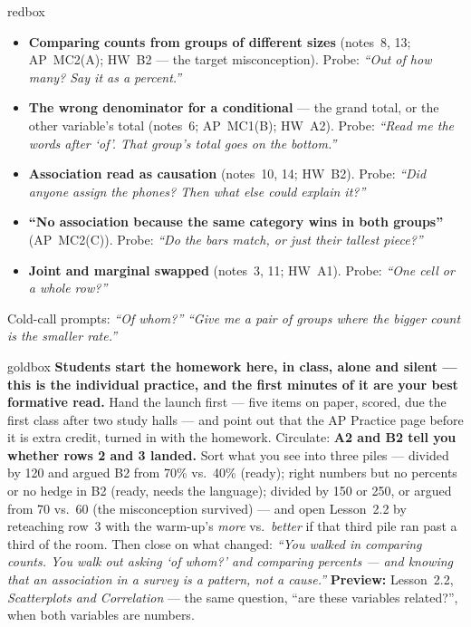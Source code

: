 \documentclass[10pt]{article}
\begin{document}
\boxguard
\begin{skillbox}{redbox}
\begin{itemize}[leftmargin=1.2em, nosep]
  \item \textbf{Comparing counts from groups of different sizes} (notes~8, 13; AP~MC2(A);
        HW~B2 --- the target misconception). Probe: \emph{``Out of how many? Say it as a
        percent.''}
  \item \textbf{The wrong denominator for a conditional} --- the grand total, or the other
        variable's total (notes~6; AP~MC1(B); HW~A2). Probe: \emph{``Read me the words after
        `of'. That group's total goes on the bottom.''}
  \item \textbf{Association read as causation} (notes~10, 14; HW~B2). Probe: \emph{``Did anyone
        assign the phones? Then what else could explain it?''}
  \item \textbf{``No association because the same category wins in both groups''} (AP~MC2(C)).
        Probe: \emph{``Do the bars match, or just their tallest piece?''}
  \item \textbf{Joint and marginal swapped} (notes~3, 11; HW~A1). Probe: \emph{``One cell or a
        whole row?''}
\end{itemize}
Cold-call prompts: \emph{``Of whom?''} \quad \emph{``Give me a pair of groups where the bigger
count is the smaller rate.''}
\end{skillbox}

\boxguard
\begin{skillbox}{goldbox}
\textbf{Students start the homework here, in class, alone and silent --- this is the individual
practice, and the first minutes of it are your best formative read.} Hand the launch first ---
five items on paper, scored, due the first class after two study halls --- and point out that
the AP Practice page before it is extra credit, turned in with the homework. Circulate:
\textbf{A2 and B2 tell you whether rows 2 and 3 landed.} Sort what you see into three piles ---
divided by 120 and argued B2 from 70\% vs.\ 40\% (ready); right numbers but no percents or no
hedge in B2 (ready, needs the language); divided by 150 or 250, or argued from 70 vs.\ 60 (the
misconception survived) --- and open Lesson~2.2 by reteaching row~3 with the warm-up's
\emph{more} vs.\ \emph{better} if that third pile ran past a third of the room. Then close on
what changed: \emph{``You walked in comparing counts. You walk out asking `of whom?' and comparing
percents --- and knowing that an association in a survey is a pattern, not a cause.''}
\textbf{Preview:} Lesson~2.2, \emph{Scatterplots and Correlation} --- the same question, ``are
these variables related?'', when both variables are numbers.
\end{skillbox}
\end{document}
